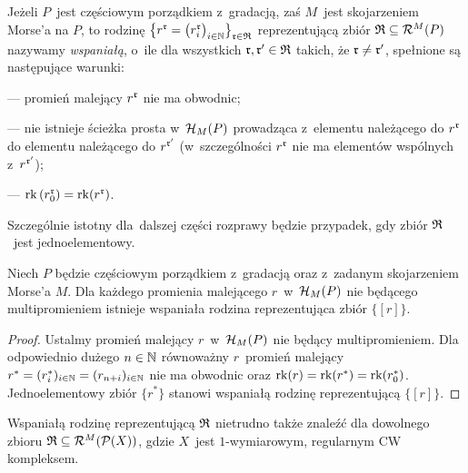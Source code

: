 Jeżeli $P$~jest częściowym porządkiem z~gradacją, zaś $M$~jest skojarzeniem Morse'a na $P$, to rodzinę $\left\{r^{\mathfrak{r}}=\bigl(r^{\mathfrak{r}}_i\right)_{i\in\mathbb{N}}\bigr\}_{\mathfrak{r}\in\mathfrak{R}}$ reprezentującą zbiór $\mathfrak{R}\subseteq \mathcal{R}^M(P)$ nazywamy \textit{wspaniałą}, o~ile dla wszystkich $\mathfrak{r},\mathfrak{r}'\in\mathfrak{R}$ takich, że $\mathfrak{r}\not=\mathfrak{r}'$, spełnione są następujące warunki:
\begin{compactitem}
\item[---] promień malejący $r^{\mathfrak{r}}$ nie ma obwodnic;
\item[---] nie istnieje ścieżka prosta w~$\mathcal{H}_M(P)$ prowadząca z~elementu należącego do $r^{\mathfrak{r}}$ do elementu należącego do $r^{\mathfrak{r}'}$ (w~szczególności $r^{\mathfrak{r}}$ nie ma elementów wspólnych z~$r^{\mathfrak{r}'}$);
\item[---] $\operatorname{rk}\left(r^{\mathfrak{r}}_0\right)=\operatorname{rk}(r^{\mathfrak{r}})$.
\end{compactitem}

Szczególnie istotny dla~dalszej części rozprawy będzie przypadek, gdy zbiór $\mathfrak{R}$~jest jednoelementowy.

\begin{lem}\label{istnieje_rodzina_wspaniala_dla_jednoelementowego}
Niech $P$ będzie częściowym porządkiem z~gradacją oraz z~zadanym skojarzeniem Morse'a $M$. Dla każdego promienia malejącego $r$~w~$\mathcal{H}_{M}(P)$ nie będącego multipromieniem istnieje wspaniała rodzina reprezentująca zbiór $\{[r]\}$.
\end{lem}
\begin{proof}
Ustalmy promień malejący $r$~w~$\mathcal{H}_M(P)$ nie będący multipromieniem. Dla odpowiednio dużego $n\in\mathbb{N}$ równoważny $r$~promień malejący $r^*=(r^*_{i})_{i\in\mathbb{N}}=(r_{n+i})_{i\in\mathbb{N}}$ nie ma obwodnic oraz $\operatorname{rk}(r)=\operatorname{rk}(r^*)=\operatorname{rk}(r^*_0)$. Jednoelementowy zbiór $\{r^*\}$ stanowi wspaniałą rodzinę reprezentującą $\{[r]\}$.
\end{proof}

Wspaniałą rodzinę reprezentującą $\mathfrak{R}$ nietrudno także znaleźć dla dowolnego zbioru $\mathfrak{R}\subseteq \mathcal{R}^M(\mathcal{P}(X))$, gdzie $X$~jest $1$-wymiarowym, regularnym CW kompleksem.

